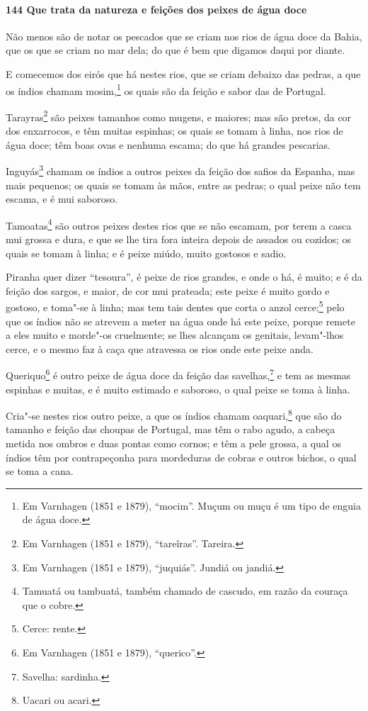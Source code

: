 \begin{linenumbers}
\paragraph{144 Que trata da natureza e feições dos peixes de água doce}\quad
Não menos são de notar os pescados que se criam nos rios de água doce da Bahia, que os que
se criam no mar dela; do que é bem que digamos daqui por diante.

E comecemos dos eirós que há nestes rios, que se criam debaixo das pedras, a que os índios
chamam mosim,\footnote{ Em Varnhagen (1851 e 1879), ``mocim''. Muçum ou muçu é um tipo de
enguia de água doce.} os quais são da feição e sabor das de Portugal.

Tarayras\footnote{ Em Varnhagen (1851 e 1879), ``tareîras''. Tareira.} são peixes tamanhos
como mugens, e maiores; mas são pretos, da cor dos enxarrocos, e têm muitas espinhas; os
quais se tomam à linha, nos rios de água doce; têm boas ovas e nenhuma escama; do que há
grandes pescarias.

Inguyás\footnote{ Em Varnhagen (1851 e 1879), ``juquiás''. Jundiá ou jandiá.} chamam os
índios a outros peixes da feição dos safios da Espanha, mas mais pequenos; os quais se
tomam às mãos, entre as pedras; o qual peixe não tem escama, e é mui saboroso.

Tamoatas\footnote{ Tamuatá ou tambuatá, também chamado de cascudo, em razão da couraça que
o cobre.} são outros peixes destes rios que se não escamam, por terem a casca mui grossa e
dura, e que se lhe tira fora inteira depois de assados ou cozidos; os quais se tomam à
linha; e é peixe miúdo, muito gostosos e sadio.

Piranha quer dizer ``tesoura'', é peixe de rios grandes, e onde o há, é muito; e é da
feição dos sargos, e maior, de cor mui prateada; este peixe é muito gordo e gostoso, e
toma"-se à linha; mas tem tais dentes que corta o anzol cerce;\footnote{ Cerce: rente.}
pelo que os índios não se atrevem a meter na água onde há este peixe, porque remete a eles
muito e morde"-os cruelmente; se lhes alcançam os genitais, levam"-lhos cerce, e o mesmo faz
à caça que atravessa os rios onde este peixe anda.

Queriquo\footnote{ Em Varnhagen (1851 e 1879), ``querico''.} é outro peixe de água doce da
feição das savelhas,\footnote{ Savelha: sardinha.} e tem as mesmas espinhas e muitas, e é
muito estimado e saboroso, o qual peixe se toma à linha.

Cria"-se nestes rios outro peixe, a que os índios chamam oaquari,\footnote{ Uacari ou
acari.} que são do tamanho e feição das choupas de Portugal, mas têm o rabo agudo, a
cabeça metida nos ombros e duas pontas como cornos; e têm a pele grossa, a qual os índios
têm por contrapeçonha para mordeduras de cobras e outros bichos, o qual se toma a cana.


\end{linenumbers}
